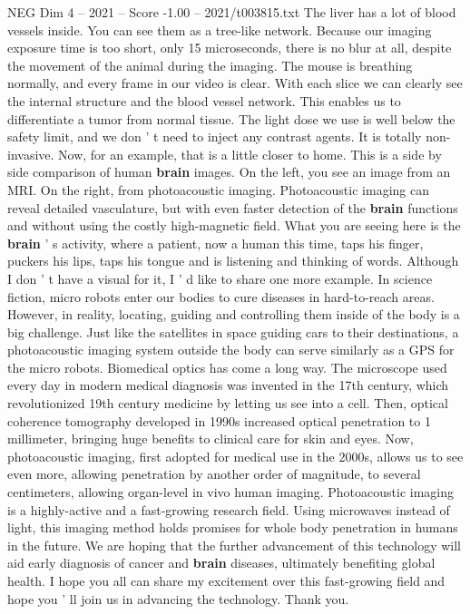 \begin{textsample}{NEG Dim 4 – 2021 – Score -1.00 – 2021/t003815.txt}
The liver has a lot of blood vessels inside.
You can see them as a tree-like network.
Because our imaging exposure time is too short, only 15 microseconds, there is no blur at all, despite the movement of the animal during the imaging.
The mouse is breathing normally, and every frame in our video is clear.
With each slice we can clearly see the internal structure and the blood vessel network.
This enables us to differentiate a tumor from normal tissue.
The light dose we use is well below the safety limit, and we don ' t need to inject any contrast agents.
It is totally non-invasive.
Now, for an example, that is a little closer to home.
This is a side by side comparison of human \textbf{brain} images.
On the left, you see an image from an MRI.
On the right, from photoacoustic imaging.
Photoacoustic imaging can reveal detailed vasculature, but with even faster detection of the \textbf{brain} functions and without using the costly high-magnetic field.
What you are seeing here is the \textbf{brain} ' s activity, where a patient, now a human this time, taps his finger, puckers his lips, taps his tongue and is listening and thinking of words.
Although I don ' t have a visual for it, I ' d like to share one more example.
In science fiction, micro robots enter our bodies to cure diseases in hard-to-reach areas.
However, in reality, locating, guiding and controlling them inside of the body is a big challenge.
Just like the satellites in space guiding cars to their destinations, a photoacoustic imaging system outside the body can serve similarly as a GPS for the micro robots.
Biomedical optics has come a long way.
The microscope used every day in modern medical diagnosis was invented in the 17th century, which revolutionized 19th century medicine by letting us see into a cell.
Then, optical coherence tomography developed in 1990s increased optical penetration to 1 millimeter, bringing huge benefits to clinical care for skin and eyes.
Now, photoacoustic imaging, first adopted for medical use in the 2000s, allows us to see even more, allowing penetration by another order of magnitude, to several centimeters, allowing organ-level in vivo human imaging.
Photoacoustic imaging is a highly-active and a fast-growing research field.
Using microwaves instead of light, this imaging method holds promises for whole body penetration in humans in the future.
We are hoping that the further advancement of this technology will aid early diagnosis of cancer and \textbf{brain} diseases, ultimately benefiting global health.
I hope you all can share my excitement over this fast-growing field and hope you ' ll join us in advancing the technology.
Thank you.

\end{textsample}
